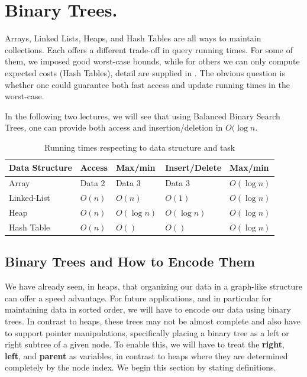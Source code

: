 



\usepackage{tabularx}


\ifdefined\BOOK
\else
\setcounter{chapter}{5}
\fi

\chapter*{Binary Trees.} 
\thispagestyle{firststyle}

Arrays, Linked Lists, Heaps, and Hash Tables are all ways to maintain collections. Each offers a different trade-off in query running times. For some of them, we imposed good worst-case bounds, while for others we can only compute expected costs (Hash Tables), detail are supplied in . The obvious question is whether one could guarantee both fast access and update running times in the worst-case. 

In the following two lectures, we will see that using Balanced Binary Search Trees, one can provide both access and insertion/deletion in $O(\log n $. 

\begin{table}[h!]
\centering
\begin{tabularx}{\textwidth}{XXXXX}
\textbf{Data Structure} & \textbf{Access} & \textbf{Max/min} & \textbf{Insert/Delete} & \textbf{Max/min}  \\ \hline
Array                   & Data 2          & Data 3           & Data 3                 & $O(\log n)$          \\ 
Linked-List             & $O(n)$          & $O(n)$           & $O(1)$                 & $O(\log n)$          \\ 
Heap                    & $O(n)$          & $O(\log n)$      & $O(\log n) $           & $O(\log n)$          \\ 
Hash Table              & $O(n)$          & $O( )$           & $O( )$                 & $O(\log n)$          \\ 
\end{tabularx}
\caption{Running times respecting to data structure and task }
\label{tab:datastructs}
\end{table}


\section{Binary Trees and How to Encode Them}
We have already seen, in heaps, that organizing our data in a graph-like structure can offer a speed advantage. For future applications, and in particular for maintaining data in sorted order, we will have to encode our data using binary trees. In contrast to heaps, these trees may not be almost complete and also have to support pointer manipulations, specifically placing a binary tree as a left or right subtree of a given node. To enable this, we will have to treat the \textbf{right}, \textbf{left}, and \textbf{parent} as variables, in contrast to heaps where they are determined completely by the node index. We begin this section by stating definitions.



